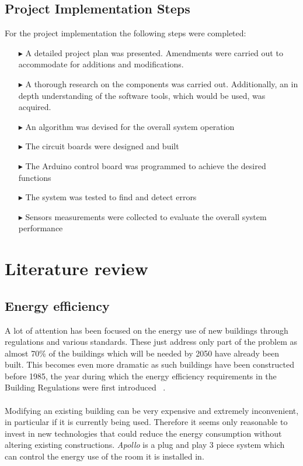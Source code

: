 \documentclass[12pt,a4paper,draft]{report}
\begin{document}
\section{Project Implementation Steps}
For the project implementation the following steps were completed:
\begin{itemize}
	\item[$\blacktriangleright$] A detailed project plan was presented. 
		Amendments were carried out to accommodate for additions and modifications.
	\item[$\blacktriangleright$] A thorough research on the components was carried out. 
		Additionally, an in depth understanding of the software tools, which would be used, was acquired.
	\item[$\blacktriangleright$] An algorithm was devised for the overall system operation
	\item[$\blacktriangleright$] The circuit boards were designed and built
	\item[$\blacktriangleright$] The Arduino control board was programmed to achieve the desired functions
	\item[$\blacktriangleright$] The system was tested to find and detect errors
	\item[$\blacktriangleright$] Sensors measurements were collected to evaluate the overall system performance
\end{itemize}
%
\newpage
\chapter{Literature review}
%
\section{Energy efficiency}
A lot of attention has been focused on the energy use of new buildings through regulations and various standards. These just address only part of the problem as almost 70\% of the buildings which will be needed by 2050 have already been built. This becomes even more dramatic as such buildings have been constructed before 1985, the year during which the energy efficiency requirements in the Building Regulations were first introduced ~\cite{website:building_reg,website:carbon_trust}.
\ \\
\ \\
Modifying an existing building can be very expensive and extremely inconvenient, in particular if it is currently being used. Therefore it seems only reasonable to invest in new technologies that could reduce the energy consumption without altering existing constructions. \emph{Apollo} is a plug and play 3 piece system which can control the energy use of the room it is installed in.\\
\ \\
%
\end{document}

